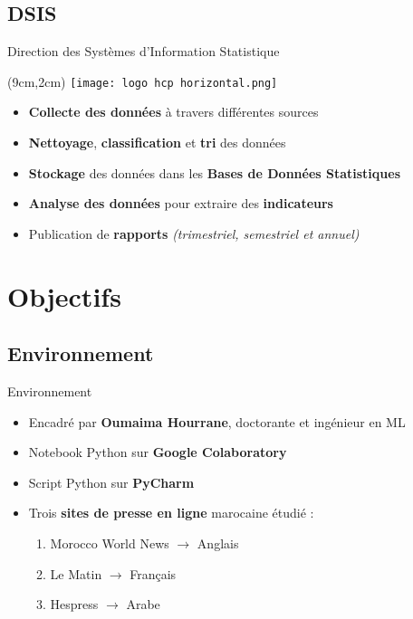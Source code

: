 \documentclass[10pt,sans,usenames,dvipsnames,english,compress]{beamer}
\begin{document}
\subsection{DSIS}
\begin{frame}{Direction des Systèmes d’Information Statistique}
	\begin{textblock*}{3cm}(9cm,2cm) %
		\texttt{[image: logo hcp horizontal.png]}
	\end{textblock*}

	\vspace{1cm}

	\begin{itemize}
		\item \textbf{Collecte des données} à travers différentes sources
            \item \textbf{Nettoyage}, \textbf{classification} et \textbf{tri} des données
            \item \textbf{Stockage} des données dans les \textbf{Bases de Données Statistiques}
            \item \textbf{Analyse des données} pour extraire des \textbf{indicateurs}
            \item Publication de \textbf{rapports} \emph{(trimestriel, semestriel et annuel)}
	\end{itemize}
\end{frame}

\section{Objectifs}
\subsection{Environnement}
\begin{frame}{Environnement}
	\begin{itemize}
		\item Encadré par \textbf{Oumaima Hourrane}, doctorante et ingénieur en ML
		\item Notebook Python sur \textbf{Google Colaboratory}
            \item Script Python sur \textbf{PyCharm}\newline
            \item Trois \textbf{sites de presse en ligne} marocaine étudié :
                \begin{enumerate}
                    \item \normalsize{Morocco World News $\rightarrow$ Anglais}
                    \item \normalsize{Le Matin $\rightarrow$ Français}
                    \item \normalsize{Hespress $\rightarrow$ Arabe}
                \end{enumerate}
        \end{itemize}
\end{frame}
\end{document}
